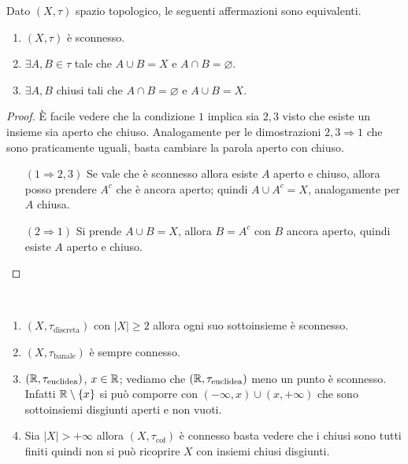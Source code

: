 \begin{theorem}
	Dato $(X, \tau)$ spazio topologico, le seguenti affermazioni sono equivalenti. 
	\begin{enumerate}
		\item $(X, \tau)$ è sconnesso. 
		\item $\exists A, B \in \tau$ tale che $A \cup B = X$ e $A \cap B = \varnothing$.
		\item $\exists A, B$ chiusi tali che $A\cap B = \varnothing$ e $A \cup B = X$.
	\end{enumerate}
\end{theorem} 
\begin{proof}
	È facile vedere che la condizione $1$ implica sia $2,3$ visto che esiste un insieme sia aperto che chiuso. Analogamente per le dimostrazioni $2,3 \Rightarrow 1$ che sono praticamente uguali, basta cambiare la parola aperto con chiuso. 
	\begin{enumerate}
		\item[$(1\Rightarrow 2,3)$] Se vale che è sconnesso allora esiste $A$ aperto e chiuso, allora posso prendere $A^c$ che è ancora aperto; quindi $A\cup A^c = X$, analogamente per $A$ chiusa. 
		\item[$(2 \Rightarrow 1)$] Si prende $A \cup B = X$, allora $B = A^c$ con $B$ ancora aperto, quindi esiste $A$ aperto e chiuso. 
	\end{enumerate}
\end{proof}

\begin{example}\
\begin{enumerate}
	\item $(X, \tau_{\text{discreta}})$ con $|X| \ge 2$ allora ogni suo sottoinsieme è sconnesso. 
	\item $(X, \tau_{\text{banale}})$ è sempre connesso. 
	\item $(\mathbb{R}, \tau_{\text{euclidea}})$, $x \in \mathbb{R}$; vediamo che $(\mathbb{R}, \tau_{\text{euclidea}})$ meno un punto è sconnesso. Infatti $\mathbb{R} \setminus \left\{x\right\}$ si può comporre con $(-\infty, x) \cup (x, +\infty)$ che sono sottoinsiemi disgiunti aperti e non vuoti. 
	\item Sia $|X| > + \infty$ allora $(X, \tau_{\text{cof}})$ è connesso basta vedere che i chiusi sono tutti finiti quindi non si può ricoprire $X$ con insiemi chiusi disgiunti. 
\end{enumerate}
\end{example}


